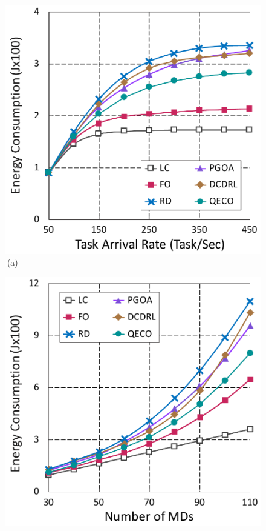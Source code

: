 \documentclass[10pt, journal,letterpaper]{IEEEtran}
\begin{document}
\begin{figure}[tbp]
\captionsetup{name=Fig.}
\begin{minipage}[b]{0.50\linewidth}
	\centering
	\includegraphics[width=\textwidth]{ energy_1} 		
	\textcolor{white}{i}\hspace{0.6cm}(a)
\end{minipage}
\hspace{-0.2cm}
\begin{minipage}[b]{0.50\linewidth}
	\centering
	\includegraphics[width=\textwidth]{ energy_2}

\end{minipage}
\end{figure}
\end{document}
